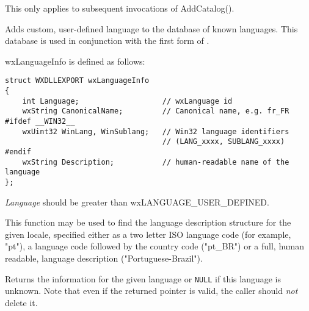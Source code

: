 This only applies to subsequent invocations of AddCatalog().

\label{wxlocaleaddlanguage}


Adds custom, user-defined language to the database of known languages. This
database is used in conjunction with the first form of 
. 

wxLanguageInfo is defined as follows:

\begin{verbatim}
struct WXDLLEXPORT wxLanguageInfo
{
    int Language;                   // wxLanguage id
    wxString CanonicalName;         // Canonical name, e.g. fr_FR
#ifdef __WIN32__
    wxUint32 WinLang, WinSublang;   // Win32 language identifiers
                                    // (LANG_xxxx, SUBLANG_xxxx)
#endif
    wxString Description;           // human-readable name of the language
};
\end{verbatim}


{\it Language} should be greater than wxLANGUAGE\_USER\_DEFINED.



\label{wxlocalefindlanguageinfo}


This function may be used to find the language description structure for the
given locale, specified either as a two letter ISO language code (for example,
"pt"), a language code followed by the country code ("pt\_BR") or a full, human
readable, language description ("Portuguese-Brazil").

Returns the information for the given language or {\tt NULL} if this language
is unknown. Note that even if the returned pointer is valid, the caller should
{\it not} delete it.




\label{wxlocalegetcanonicalname}


